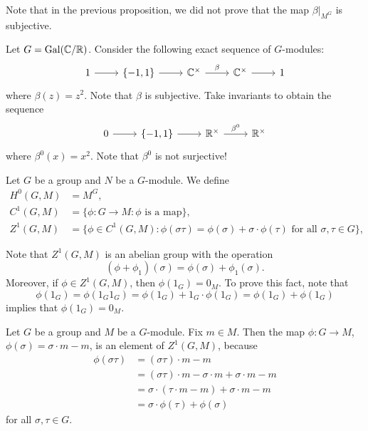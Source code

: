 Note that in the previous proposition, we did not prove that
the map $\beta|_{M^G}$ is subjective. 

\begin{example}
    Let $G=\operatorname{Gal}(\mathbb{C}/\mathbb{R})$. Consider the following exact sequence
    of $G$-modules:
    \[
    \begin{tikzcd}
    1 & \{-1,1\} & \C^\times & \C^\times & 1
    \arrow[from=1-1, to=1-2]
    \arrow[from=1-2, to=1-3]
    \arrow["\beta", from=1-3, to=1-4]
    \arrow[from=1-4, to=1-5]
    \end{tikzcd}    
    \]
    where $\beta(z)=z^2$. Note that $\beta$ is subjective. Take invariants 
    to obtain the sequence  
    \[
    \begin{tikzcd}
     0 & \{-1,1\} & \R^\times & \R^\times 
     \arrow[from=1-1, to=1-2]
     \arrow[from=1-2, to=1-3]
     \arrow["\beta^0", from=1-3, to=1-4]
     \end{tikzcd}
     \]
     where $\beta^0(x)=x^2$. Note that $\beta^0$ is not surjective! 
\end{example}

\begin{definition}
    Let $G$ be a group and $N$ be a $G$-module. 
    We define 
    \begin{align*}
        H^0(G,M)&=M^G,\\
        C^1(G,M)&=\{\phi\colon G\to M:\phi\text{ is a map}\},\\
        Z^1(G,M)&=\{\phi\in C^1(G,M):\phi(\sigma\tau)=\phi(\sigma)+\sigma\cdot\phi(\tau)\text{ for all $\sigma,\tau\in G$}\},
        \end{align*}    
\end{definition}

Note that $Z^1(G,M)$ is an abelian group with the operation
\[
(\phi+\phi_1)(\sigma)=\phi(\sigma)+\phi_1(\sigma).
\]
Moreover, if $\phi\in Z^1(G,M)$, then 
$\phi(1_G)=0_M$. To prove this fact, note that  
\[
\phi(1_G)=\phi(1_G1_G)=\phi(1_G)+1_G\cdot\phi(1_G)=\phi(1_G)+\phi(1_G)
\]
implies
that $\phi(1_G)=0_M$. 

\begin{example}
\label{exa:BinZ}
    Let $G$ be a group and $M$ be a $G$-module. Fix $m\in M$. Then
    the map $\phi\colon G\to M$, $\phi(\sigma)=\sigma\cdot m-m$, is an element 
    of $Z^1(G,M)$, because 
    \begin{align*}
    \phi(\sigma\tau)&=(\sigma\tau)\cdot m-m\\
    &=(\sigma\tau)\cdot m-\sigma\cdot m+\sigma\cdot m-m\\
    &=\sigma\cdot (\tau\cdot m-m)+\sigma\cdot m-m\\
    &=\sigma\cdot \phi(\tau)+\phi(\sigma)   
    \end{align*}
    for all $\sigma,\tau\in G$.
\end{example}

